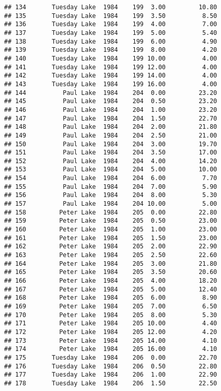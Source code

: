 \documentclass[
]{article}
\begin{document}
\begin{verbatim}
## 134       Tuesday Lake  1984    199  3.00         10.80
## 135       Tuesday Lake  1984    199  3.50          8.50
## 136       Tuesday Lake  1984    199  4.00          7.00
## 137       Tuesday Lake  1984    199  5.00          5.40
## 138       Tuesday Lake  1984    199  6.00          4.90
## 139       Tuesday Lake  1984    199  8.00          4.20
## 140       Tuesday Lake  1984    199 10.00          4.00
## 141       Tuesday Lake  1984    199 12.00          4.00
## 142       Tuesday Lake  1984    199 14.00          4.00
## 143       Tuesday Lake  1984    199 16.00          4.00
## 144          Paul Lake  1984    204  0.00         23.20
## 145          Paul Lake  1984    204  0.50         23.20
## 146          Paul Lake  1984    204  1.00         23.20
## 147          Paul Lake  1984    204  1.50         22.70
## 148          Paul Lake  1984    204  2.00         21.80
## 149          Paul Lake  1984    204  2.50         21.00
## 150          Paul Lake  1984    204  3.00         19.70
## 151          Paul Lake  1984    204  3.50         17.00
## 152          Paul Lake  1984    204  4.00         14.20
## 153          Paul Lake  1984    204  5.00         10.00
## 154          Paul Lake  1984    204  6.00          7.70
## 155          Paul Lake  1984    204  7.00          5.90
## 156          Paul Lake  1984    204  8.00          5.30
## 157          Paul Lake  1984    204 10.00          5.00
## 158         Peter Lake  1984    205  0.00         22.80
## 159         Peter Lake  1984    205  0.50         23.00
## 160         Peter Lake  1984    205  1.00         23.00
## 161         Peter Lake  1984    205  1.50         23.00
## 162         Peter Lake  1984    205  2.00         22.90
## 163         Peter Lake  1984    205  2.50         22.60
## 164         Peter Lake  1984    205  3.00         21.80
## 165         Peter Lake  1984    205  3.50         20.60
## 166         Peter Lake  1984    205  4.00         18.20
## 167         Peter Lake  1984    205  5.00         12.40
## 168         Peter Lake  1984    205  6.00          8.90
## 169         Peter Lake  1984    205  7.00          6.50
## 170         Peter Lake  1984    205  8.00          5.30
## 171         Peter Lake  1984    205 10.00          4.40
## 172         Peter Lake  1984    205 12.00          4.20
## 173         Peter Lake  1984    205 14.00          4.10
## 174         Peter Lake  1984    205 16.00          4.10
## 175       Tuesday Lake  1984    206  0.00         22.70
## 176       Tuesday Lake  1984    206  0.50         22.80
## 177       Tuesday Lake  1984    206  1.00         22.90
## 178       Tuesday Lake  1984    206  1.50         22.50

\end{verbatim}
\end{document}
